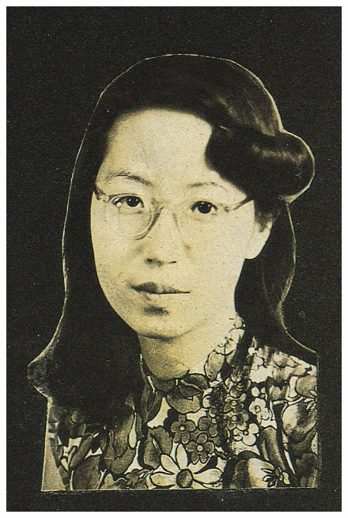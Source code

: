 \begin{figure}[htb]
    \centering %
    \includegraphics[scale=0.4]{picture/对照记26.jpeg}
\end{figure}

